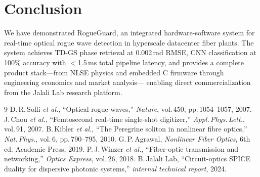 \documentclass[10pt,twocolumn]{article}
\begin{document}
\section{Conclusion}
\label{sec:conclusion}

We have demonstrated RogueGuard, an integrated hardware-software system for
real-time optical rogue wave detection in hyperscale datacenter fiber plants.
The system achieves TD-GS phase retrieval at 0.002\,rad RMSE,
CNN classification at 100\% accuracy with $<$1.5\,ms total
pipeline latency, and provides a complete product stack---from NLSE physics
and embedded C firmware through engineering economics and market analysis---
enabling direct commercialization from the Jalali Lab research platform.

\begin{thebibliography}{9}
 D.\,R.\,Solli \textit{et al.}, ``Optical rogue waves,''
  \textit{Nature}, vol.\,450, pp.\,1054--1057, 2007.
 J.\,Chou \textit{et al.}, ``Femtosecond real-time
  single-shot digitizer,'' \textit{Appl.\,Phys.\,Lett.}, vol.\,91, 2007.
 B.\,Kibler \textit{et al.}, ``The Peregrine soliton
  in nonlinear fibre optics,'' \textit{Nat.\,Phys.}, vol.\,6, pp.\,790--795, 2010.
 G.\,P.\,Agrawal, \textit{Nonlinear Fiber Optics},
  6th ed. Academic Press, 2019.
 P.\,J.\,Winzer \textit{et al.}, ``Fiber-optic transmission
  and networking,'' \textit{Optics Express}, vol.\,26, 2018.
 B.\,Jalali Lab, ``Circuit-optics SPICE duality for
  dispersive photonic systems,'' \textit{internal technical report}, 2024.
\end{thebibliography}
\end{document}
